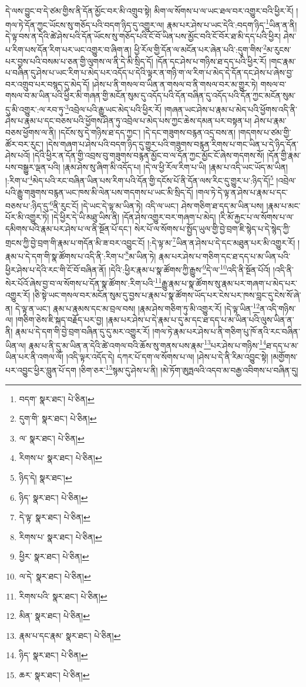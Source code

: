 དེ་ལས་བྱུང་བ་དེ་ཙམ་གྱིས་ནི་དོན་མྱོང་བར་མི་འགྲུབ་སྟེ། མིག་ལ་སོགས་པ་ལ་ཡང་ཐལ་བར་འགྱུར་བའི་ཕྱིར་རོ། །གལ་ཏེ་དོན་ཀྱང་ཡོངས་སུ་གཅོད་པའི་བདག་ཉིད་དུ་འགྱུར་ལ། རྣམ་པར་ཤེས་པ་ཡང་དེའི་:བདག་ཉིད་\footnote{བདག་  སྣར་ཐང་།  པེ་ཅིན། }ཡིན་ན་ནི། དེ་ལྟ་བས་ན་དེའི་ཚེ་ཤེས་པའི་དོན་ཡོངས་སུ་གཅོད་པའི་ངོ་བོ་ཡིན་པས་མྱོང་བའི་ངོ་བོར་ཐ་མི་དད་པའི་ཕྱིར། ཤེས་པ་རིག་པས་དོན་རིག་པར་ཡང་འགྱུར་བ་ཞིག་ན། ཕྱི་རོལ་གྱི་དོན་ལ་མངོན་པར་ཞེན་པའི་:དུག་གིས་\footnote{དུག་གི་  སྣར་ཐང་།  པེ་ཅིན། }མ་རུངས་པར་བྱས་པའི་བསམ་པ་ཅན་གྱི་ལུགས་ལ་ནི་དེ་མི་སྲིད་དོ། །དོན་དང་ཤེས་པ་གཉིས་ཐ་དད་པའི་ཕྱིར་རོ། །གང་རྣམ་པ་བཞིན་དུ་ཤེས་པ་ཡང་རིག་པ་མེད་པར་འདོད་པ་དེའི་ལྟར་ན་གཉི་ག་ལ་རིག་པ་མེད་དེ་དོན་དང་ཤེས་པ་ཞེས་བྱ་བར་འགྲུབ་པར་བསྙད་དུ་མེད་དོ། །ཤེས་པ་ནི་གསལ་བ་ཡིན་ན་གསལ་བ་ནི་གསལ་བར་མ་གྱུར་ཏེ། གསལ་བ་གསལ་བ་མ་ཡིན་པའི་ཕྱིར་མི་གཞན་གྱི་མངོན་སུམ་དུ་འདོད་པའི་དོན་བཞིན་དུ་འདོད་པའི་དོན་ཀྱང་མངོན་སུམ་དུ་མི་འགྱུར་:ལ་རབ་ཏུ་\footnote{ལ་  སྣར་ཐང་།  པེ་ཅིན། }འབྲེལ་པའི་རྒྱུ་ཡང་མེད་པའི་ཕྱིར་རོ། །གཞན་ཡང་ཤེས་པ་རྣམ་པ་མེད་པའི་ཕྱོགས་འདི་ནི་ཤེས་པ་རྣམ་པ་དང་བཅས་པའི་ཕྱོགས་ཤིན་ཏུ་འབྲེལ་པ་མེད་པས་ཀྱང་ཆེས་དམན་པར་བསྟན་པ། ཤེས་པ་རྣམ་བཅས་ཕྱོགས་ལ་ནི། །དངོས་སུ་དེ་གཉིས་ཐ་དད་ཀྱང་། །དེ་དང་གཟུགས་བརྙན་འདྲ་བས་ན། །གདགས་པ་ཙམ་གྱི་ཚོར་བར་རུང་། །དེས་གཞག་པ་ཤེས་པའི་བདག་ཉིད་དུ་གྱུར་པའི་གཟུགས་བརྙན་རིགས་པ་གང་ཡིན་པ་དེ་ཉིད་དོན་ཤེས་པའོ། །དེའི་ཕྱིར་ན་དོན་གྱི་འབྲས་བུ་གཟུགས་བརྙན་མྱོང་བ་ལ་དོན་ཀྱང་མྱོང་ངོ་ཞེས་གདགས་སོ། །དོན་གྱི་རྣམ་པས་བསྒྱུར་ལྡན་པའི། །རྣམ་ཤེས་སུ་ཞིག་མི་འདོད་པ། །དེ་ལ་ཕྱི་རོལ་རིག་པ་ཡི། །རྣམ་པ་འདི་ཡང་ཡོད་མ་ཡིན། །:རིག་པ་\footnote{རིགས་པ་  སྣར་ཐང་།  པེ་ཅིན། }མེད་པའི་རང་བཞིན་ཡིན་པས་རིག་པའི་དོན་གྱི་དངོས་པོ་ནི་དོན་ལས་རིང་དུ་གྱུར་པ་:ཉིད་དོ།\footnote{ཉིད་དེ།  སྣར་ཐང་། } །འབྲེལ་པའི་རྒྱུ་གཟུགས་བརྙན་ཡང་ཁས་མི་ལེན་པས་གདགས་པ་ཡང་མི་སྲིད་དོ། །གལ་ཏེ་དེ་ལྟ་ན་ཤེས་པ་རྣམ་པ་དང་བཅས་པ་:ཉིད་དུ་\footnote{ཉིད་  སྣར་ཐང་།  པེ་ཅིན། }ནི་རུང་ངོ། །དེ་ཡང་དེ་ལྟ་མ་ཡིན་ཏེ། འདི་ལ་ཡང་། ཤེས་གཅིག་ཐ་དད་མ་ཡིན་པས། །རྣམ་པ་མང་པོར་མི་འགྱུར་ཏེ། །དེ་ཕྱིར་དེ་ཡི་མཐུ་ཡིས་ནི། །དོན་ཤེས་འགྱུར་བར་གཞག་པ་མེད། །རི་མོ་རྐྱང་པ་ལ་སོགས་པ་ལ་དམིགས་པའི་རྣམ་པར་ཤེས་པ་ལ་ནི་སྔོན་པོ་དང་། སེར་པོ་ལ་སོགས་པ་སྤྱོད་ཡུལ་གྱི་བྱེ་བྲག་ཇི་སྙེད་པ་དེ་སྙེད་ཀྱི་གྲངས་ཀྱི་བྱེ་བྲག་གི་རྣམ་པ་གདོན་མི་ཟ་བར་འབྱུང་ངོ། །:དེ་ལྟ་མ་\footnote{དེ་ལྟ་  སྣར་ཐང་།  པེ་ཅིན། }ཡིན་ན་ཤེས་པ་དེ་དང་མཐུན་པར་མི་འགྱུར་རོ། །རྣམ་པ་དེ་དག་གི་སྣ་ཚོགས་པ་འདི་ནི་:རིག་པ་\footnote{རིགས་པ་  སྣར་ཐང་།  པེ་ཅིན། }མ་ཡིན་ཏེ། རྣམ་པར་ཤེས་པ་གཅིག་དང་ཐ་དད་པ་མ་ཡིན་པའི་ཕྱིར་ཤེས་པ་དེའི་རང་གི་ངོ་བོ་བཞིན་ནོ། །དེའི་:ཕྱིར་རྣམ་པ་སྣ་ཚོགས་ཀྱི་རྒྱུས་\footnote{ཕྱིར་  སྣར་ཐང་།  པེ་ཅིན། }དེ་ལ་\footnote{ལ་དེ་  སྣར་ཐང་།  པེ་ཅིན། }འདི་ནི་སྔོན་པོའོ། །འདི་ནི་སེར་པོའོ་ཞེས་བྱ་བ་ལ་སོགས་པ་དོན་སྣ་ཚོགས་:རིག་པའི་\footnote{རིགས་པའི་  སྣར་ཐང་།  པེ་ཅིན། }རྒྱུ་རྣམ་པ་སྣ་ཚོགས་སུ་རྣམ་པར་གཞག་པ་མེད་པར་འགྱུར་རོ། །ཅི་སྟེ་ཡང་གསལ་བར་མངོན་སུམ་དུ་བྱས་པ་རྣམ་པ་སྣ་ཚོགས་ཡོད་པར་ངེས་པར་ཁས་བླང་དུ་ངེས་སོ་ཞེ་ན། དེ་ལྟ་ན་ཡང་། རྣམ་པ་རྣམས་དང་མ་བྲལ་བས། །རྣམ་ཤེས་གཅིག་ཏུ་མི་འགྱུར་རོ། །དེ་ལྟ་ཡིན་\footnote{མིན་  སྣར་ཐང་།  པེ་ཅིན། }ན་འདི་གཉིས་ལ། །གཅིག་ཅེས་ཇི་སྐད་བརྗོད་པར་བྱ། །རྣམ་པར་ཤེས་པ་དེ་རྣམ་པ་དུ་མ་དང་ཐ་དད་པ་མ་ཡིན་པའི་ལུས་ཡིན་ན་ནི། རྣམ་པ་དེ་དག་གི་བྱེ་བྲག་བཞིན་དུ་དུ་མར་འགྱུར་རོ། །གལ་ཏེ་རྣམ་པར་ཤེས་པ་ནི་གཅིག་པུ་ཁོ་ནའི་རང་བཞིན་ཡིན་ལ། རྣམ་པ་ནི་དུ་མ་ཡིན་ན་དེའི་ཚེ་འགལ་བའི་ཆོས་སུ་གནས་པས་རྣམ་\footnote{རྣམ་པ་དང་རྣམ་  སྣར་ཐང་།  པེ་ཅིན། }པར་ཤེས་པ་གཉིས་\footnote{ཉིད་  སྣར་ཐང་།  པེ་ཅིན། }ཐ་དད་པ་མ་ཡིན་པར་ནི་འགལ་ལོ། །འདི་ལྟར་འདོད་དེ། དཀར་པོ་དག་ལ་སོགས་པ་ལ། །ཤེས་པ་དེ་ནི་རིམ་འབྱུང་སྟེ། །མགྱོགས་པར་འབྱུང་ཕྱིར་བླུན་པོ་དག །ཅིག་ཅར་\footnote{ཆར་  སྣར་ཐང་།  པེ་ཅིན། }སྙམ་དུ་ཤེས་པ་ནི། །མེ་ཏོག་ཨུཏྤལའི་འདབ་མ་བརྒྱ་འབིགས་པ་བཞིན་དུ། 